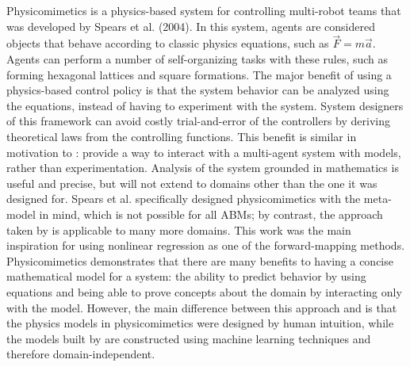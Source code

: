 Physicomimetics is a physics-based system for controlling multi-robot teams that was developed by Spears et al. (2004)\nocite{spears2004dpb}.
In this system, agents are considered objects that behave according to classic physics equations, such as $\vec{F} = m \vec{a}$.
Agents can perform a number of self-organizing tasks with these rules, such as forming hexagonal lattices and square formations.
The major benefit of using a physics-based control policy is that the system behavior can be analyzed using the equations, instead of having to experiment with the system.
System designers of this framework can avoid costly trial-and-error of the controllers by deriving theoretical laws from the controlling functions.
This benefit is similar in motivation to \fw: provide a way to interact with a multi-agent system with models, rather than experimentation.
Analysis of the system grounded in mathematics is useful and precise, but will not extend to domains other than the one it was designed for. 
Spears et al. specifically designed physicomimetics with the meta-model in mind, which is not possible for all ABMs; by contrast, the approach taken by \fw is applicable to many more domains.
This work was the main inspiration for using nonlinear regression as one of the forward-mapping methods.
Physicomimetics demonstrates that there are many benefits to having a concise mathematical model for a system: the ability to predict behavior by using equations and being able to prove concepts about the domain by interacting only with the model.
However, the main difference between this approach and \fw is that the physics models in physicomimetics were designed by human intuition,  while the models built by \fw are constructed using machine learning techniques and therefore domain-independent.

